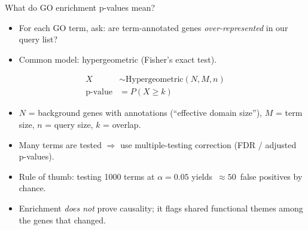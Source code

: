 \documentclass[aspectratio=169]{beamer}
\begin{document}
\begin{frame}{What do GO enrichment p-values mean?}
\small
\begin{itemize}
  \item For each GO term, ask: are term-annotated genes \emph{over-represented} in our query list?
  \item Common model: hypergeometric (Fisher's exact test).
\end{itemize}

\vspace{0.3em}
\small
\begin{align*}
X &\sim \text{Hypergeometric}(N, M, n) \\
\text{p-value} &= P(X \ge k)
\end{align*}

\vspace{-0.2em}
\small
\begin{itemize}
  \item $N$ = background genes with annotations (``effective domain size''), $M$ = term size, $n$ = query size, $k$ = overlap.
  \item Many terms are tested $\Rightarrow$ use multiple-testing correction (FDR / adjusted p-values).
  \item Rule of thumb: testing 1000 terms at $\alpha=0.05$ yields \,$\approx 50$\, false positives by chance.
  \item Enrichment \emph{does not} prove causality; it flags shared functional themes among the genes that changed.
\end{itemize}
\end{frame}
\end{document}
